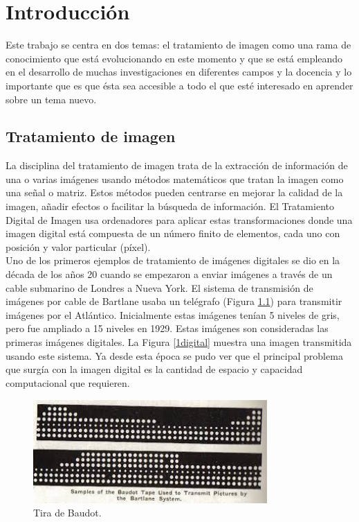 \chapter{Introducción}

Este trabajo se centra en dos temas: el tratamiento de imagen como una rama de conocimiento que está evolucionando en este momento y que se está empleando en el desarrollo de muchas investigaciones en diferentes campos y la docencia y lo importante que es que ésta sea accesible a todo el que esté interesado en aprender sobre un tema nuevo.\\

\section{Tratamiento de imagen}

La disciplina del tratamiento de imagen trata de la extracción de información de una o varias imágenes usando métodos matemáticos que tratan la imagen como una señal o matriz. Estos métodos pueden centrarse en mejorar la calidad de la imagen, añadir efectos o facilitar la búsqueda de información. El Tratamiento Digital de Imagen usa ordenadores para aplicar estas transformaciones donde una imagen digital está compuesta de un número finito de elementos, cada uno con posición y valor particular (píxel).\\

Uno de los primeros ejemplos de tratamiento de imágenes digitales se dio en la década de los años 20 cuando se empezaron a enviar imágenes a través de un cable submarino de Londres a Nueva York. El sistema de transmisión de imágenes por cable de Bartlane usaba un telégrafo (Figura \ref{telegrafo}) para transmitir imágenes por el Atlántico. Inicialmente estas imágenes tenían 5 niveles de gris, pero fue ampliado a 15 niveles en 1929. Estas imágenes son consideradas las primeras imágenes digitales. La Figura \ref{1digital} muestra una imagen transmitida usando este sistema. Ya desde esta época se pudo ver que el principal problema que surgía con la imagen digital es la cantidad de espacio y capacidad computacional que requieren.\\

\begin{figure}[h]
\centering
\includegraphics[width=0.8\textwidth]{imagenes/telegrafo}
\caption{Tira de Baudot.}
\label{telegrafo}
\end{figure}

